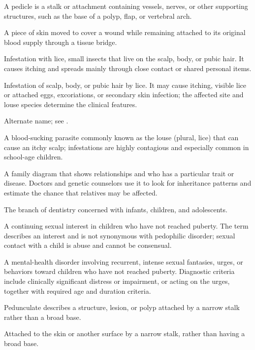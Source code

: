  A pedicle is a stalk or attachment containing vessels, nerves, or other supporting structures, such as the base of a polyp, flap, or vertebral arch.

 A piece of skin moved to cover a wound while remaining attached to its original blood supply through a tissue bridge.

 Infestation with lice, small insects that live on the scalp, body, or pubic hair. It causes itching and spreads mainly through close contact or shared personal items.

 Infestation of scalp, body, or pubic hair by lice. It may cause itching, visible lice or attached eggs, excoriations, or secondary skin infection; the affected site and louse species determine the clinical features.

 Alternate name; see .

 A blood-sucking parasite commonly known as the louse (plural, lice) that can cause an
itchy scalp; infestations are highly contagious and especially common in school-age
children.

 A family diagram that shows relationships and who has a particular trait or disease. Doctors and genetic counselors use it to look for inheritance patterns and estimate the chance that relatives may be affected.

 The branch of dentistry concerned with infants, children, and adolescents.

 A continuing sexual interest in children who have not reached puberty. The term describes an interest and is not synonymous with pedophilic disorder; sexual contact with a child is abuse and cannot be consensual.

 A mental-health disorder involving recurrent, intense sexual fantasies, urges, or behaviors toward children who have not reached puberty. Diagnostic criteria include clinically significant distress or impairment, or acting on the urges, together with required age and duration criteria.

 Pedunculate describes a structure, lesion, or polyp attached by a narrow stalk rather than a broad base.

 Attached to the skin or another surface by a narrow stalk, rather than having a broad base.

